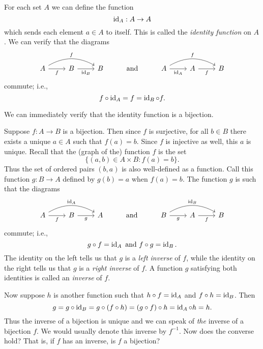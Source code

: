 \begin{sectionthm}
    For each set \(A\) we can define the function
    \[
        \operatorname{id}_A: A \to A
    \]
    which sends each element \(a \in A\) to itself. This is called the
    \emph{identity function} on \(A\). We can verify that the diagrams
    \[
        \begin{tikzcd}
            A \arrow[r, "f"'] \arrow[rr, "f", bend left] & B \arrow[r, "\id_B"'] & B & \text{and}& A \arrow[r, "\id_A"'] \arrow[rr, "f", bend left] & A \arrow[r, "f"'] & B
        \end{tikzcd}
    \]
    commute; i.e.,
    \[
        f \circ \operatorname{id}_A = f = \operatorname{id}_B \circ f.
    \]

    We can immediately verify that the identity function is a bijection.
\end{sectionthm}

\begin{sectionthm}
    Suppose \(f : A \to B\) is a bijection. Then since \(f\) is surjective, for
    all \(b \in B\) there exists a unique \(a \in A\) such that \(f(a) = b\).
    Since \(f\) is injective as well, this \(a\) is unique. Recall that the
    (graph of the) function \(f\) is the set
    \[
        \{(a, b) \in A \times B : f(a) = b\}.
    \]
    Thus the set of ordered pairs \((b, a)\) is also well-defined as a function.
    Call this function \(g : B \to A\) defined by \(g(b) = a\) when \(f(a) =
    b\). The function \(g\) is such that the diagrams
    \[
        \begin{tikzcd}
            A \arrow[r, "f"'] \arrow[rr, "\id_A", bend left] & B \arrow[r, "g"'] & A & \text{and}& B \arrow[r, "g"'] \arrow[rr, "\id_B", bend left] & A \arrow[r, "f"'] & B
        \end{tikzcd}
    \]
    commute; i.e.,
    \[
        g \circ f = \operatorname{id}_A \text{ and } f \circ g = \operatorname{id}_B.
    \]
    The identity on the left tells us that \(g\) is a \emph{left inverse} of
    \(f\), while the identity on the right tells us that \(g\) is a \emph{right
    inverse} of \(f\). A function \(g\) satisfying both identities is called an
    \emph{inverse} of \(f\).

    Now suppose \(h\) is another function such that \(h \circ f = \operatorname{id}_A\) and
    \(f \circ h = \operatorname{id}_B\). Then
    \[
        g = g \circ \operatorname{id}_B = g \circ (f \circ h) = (g \circ f) \circ h = \operatorname{id}_A \circ h = h.
    \]
    Thus the inverse of a bijection is unique and we can speak of \emph{the}
    inverse of a bijection \(f\). We would usually denote this inverse by
    \(f^{-1}\). Now does the converse hold? That is, if \(f\) has an inverse, is
    \(f\) a bijection?
\end{sectionthm}

